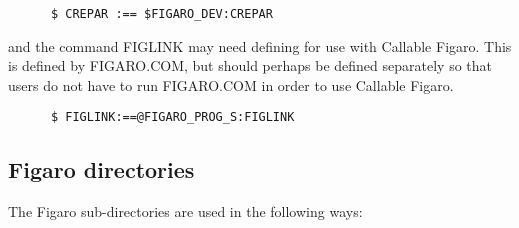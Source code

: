 \begin{verbatim}
      $ CREPAR :== $FIGARO_DEV:CREPAR
\end{verbatim}

and the command FIGLINK may need defining for use with Callable Figaro. This is
defined by FIGARO.COM, but should perhaps be defined separately so that users
do not have to run FIGARO.COM in order to use Callable Figaro.

\begin{verbatim}
      $ FIGLINK:==@FIGARO_PROG_S:FIGLINK
\end{verbatim}

\subsection{Figaro directories}

The Figaro sub-directories are used in the following ways:

